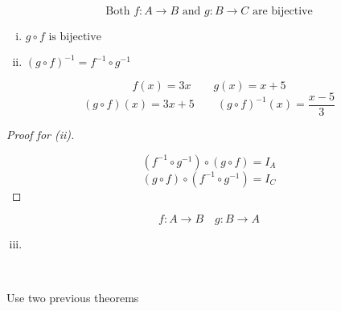 \begin{frame}{}
  \begin{theorem}
    \[
      \text{Both } f: A \to B \text{ and } g: B \to C \text{ are bijective}
    \]

    \begin{enumerate}[(i)]
      \item $g \circ f \text{ is bijective}$
      \item $(g \circ f)^{-1} = f^{-1} \circ g^{-1}$
    \end{enumerate}
  \end{theorem}

  \pause
  \[
    f(x) = 3x \qquad g(x) = x + 5
  \]
  \pause
  \[
    (g \circ f)(x) = 3x + 5  \qquad (g \circ f)^{-1}(x) = \frac{x-5}{3}
  \]
  \pause
  \begin{proof}[Proof for (ii)]
    \pause
    \begin{center}
    \end{center}
    \[
      (f^{-1} \circ g^{-1}) \circ (g \circ f) = I_A
    \]
    \[
      (g \circ f) \circ (f^{-1} \circ g^{-1}) = I_C
    \]
  \end{proof}
\end{frame}

\begin{frame}{}
  \begin{theorem}[]
    \[
      f: A \to B \quad g: B \to A
    \]

    \begin{enumerate}[(i)]
      \setcounter{enumi}{2}
      \item {}
    \end{enumerate}
  \end{theorem}

  \pause
  \begin{center}
     \\[5pt]
  \end{center}

  \pause
  \vspace{0.20cm}
  \begin{center}
    Use two previous theorems
  \end{center}
\end{frame}
